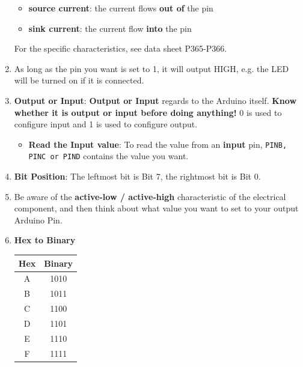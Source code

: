 \documentclass[10pt, landscape]{article}
\begin{document}
\begin{multicols}{4}
\begin{enumerate}
    \begin{itemize}
        \item \textbf{source current}: the current flows \textbf{out of} the pin
        \item \textbf{sink current}: the current flow \textbf{into} the pin
    \end{itemize}
    For the specific characteristics, see data sheet P365-P366.
    \item As long as the pin you want is set to 1, it will output HIGH, e.g. the LED will be turned on if it is connected.
    \item \textbf{Output or Input}: \textbf{Output or Input} regards to the Arduino itself. \textbf{Know whether it is output or input before doing anything!} 0 is used to configure input and 1 is used to configure output.
    \begin{itemize}
        \item \textbf{Read the Input value}: To read the value from an \textbf{input} pin, \texttt{PINB, PINC or PIND} contains the value you want.
    \end{itemize}
    \item \textbf{Bit Position}: The leftmost bit is Bit 7, the rightmost bit is Bit 0.
    \item Be aware of the \textbf{active-low / active-high} characteristic of the electrical component, and then think about what value you want to set to your output Arduino Pin.
    \item \textbf{Hex to Binary}
    \begin{center}
        \begin{tabular}{|c|c|}
            \hline
            Hex & Binary \\
            \hline
            A & 1010 \\
            \hline
            B & 1011 \\
            \hline
            C & 1100 \\
            \hline
            D & 1101 \\
            \hline
            E & 1110 \\
            \hline
            F & 1111 \\
            \hline
        \end{tabular}      
    \end{center}

\end{enumerate}


\end{multicols}
\end{document}
